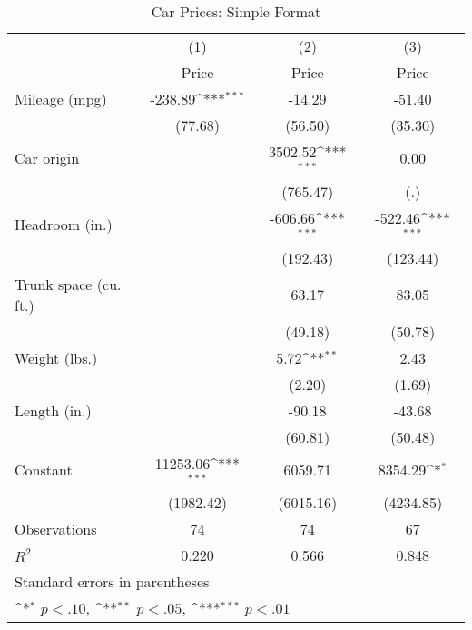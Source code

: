 \begin{table}[htbp]\centering
\def\sym#1{\ifmmode^{#1}\else\(^{#1}\)\fi}
\caption{Car Prices: Simple Format}
\begin{tabular}{l*{3}{c}}
\hline\hline
                    &\multicolumn{1}{c}{(1)}&\multicolumn{1}{c}{(2)}&\multicolumn{1}{c}{(3)}\\
                    &\multicolumn{1}{c}{Price}&\multicolumn{1}{c}{Price}&\multicolumn{1}{c}{Price}\\
\hline
Mileage (mpg)       &     -238.89\sym{***}&      -14.29         &      -51.40         \\
                    &     (77.68)         &     (56.50)         &     (35.30)         \\
[1em]
Car origin          &                     &     3502.52\sym{***}&        0.00         \\
                    &                     &    (765.47)         &         (.)         \\
[1em]
Headroom (in.)      &                     &     -606.66\sym{***}&     -522.46\sym{***}\\
                    &                     &    (192.43)         &    (123.44)         \\
[1em]
Trunk space (cu. ft.)&                     &       63.17         &       83.05         \\
                    &                     &     (49.18)         &     (50.78)         \\
[1em]
Weight (lbs.)       &                     &        5.72\sym{**} &        2.43         \\
                    &                     &      (2.20)         &      (1.69)         \\
[1em]
Length (in.)        &                     &      -90.18         &      -43.68         \\
                    &                     &     (60.81)         &     (50.48)         \\
[1em]
Constant            &    11253.06\sym{***}&     6059.71         &     8354.29\sym{*}  \\
                    &   (1982.42)         &   (6015.16)         &   (4234.85)         \\
\hline
Observations        &          74         &          74         &          67         \\
\(R^{2}\)           &       0.220         &       0.566         &       0.848         \\
\hline\hline
\multicolumn{4}{l}{\footnotesize Standard errors in parentheses}\\
\multicolumn{4}{l}{\footnotesize \sym{*} \(p<.10\), \sym{**} \(p<.05\), \sym{***} \(p<.01\)}\\
\end{tabular}
\end{table}

